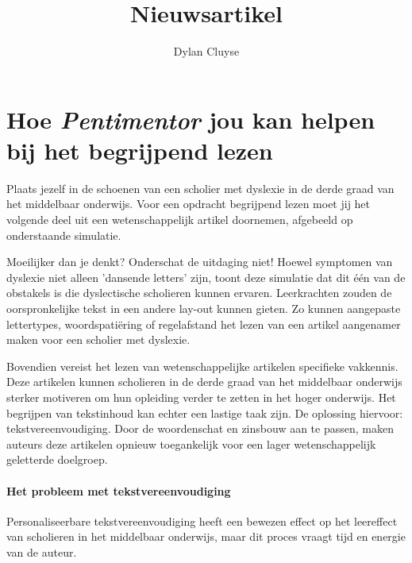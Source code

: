 \documentclass[a4paper,9pt,twoside]{report}
\title{Nieuwsartikel}
\author{Dylan {Cluyse}}
\begin{document}
	
\chapter{Hoe \textit{Pentimentor} jou kan helpen bij het begrijpend lezen}

\noindent Plaats jezelf in de schoenen van een scholier met dyslexie in de derde graad van het middelbaar onderwijs. Voor een opdracht begrijpend lezen moet jij het volgende deel uit een wetenschappelijk artikel doornemen, afgebeeld op onderstaande simulatie.

\begin{figure}[H]
\end{figure}

\noindent Moeilijker dan je denkt? Onderschat de uitdaging niet! Hoewel symptomen van dyslexie niet alleen 'dansende letters'  zijn, toont deze simulatie dat dit één van de obstakels is die dyslectische scholieren kunnen ervaren. Leerkrachten zouden de oorspronkelijke tekst in een andere lay-out kunnen gieten. Zo kunnen aangepaste lettertypes, woordspatiëring of regelafstand het lezen van een artikel aangenamer maken voor een scholier met dyslexie.

\medspace

\noindent Bovendien vereist het lezen van wetenschappelijke artikelen specifieke vakkennis. Deze artikelen kunnen scholieren in de derde graad van het middelbaar onderwijs sterker motiveren om hun opleiding verder te zetten in het hoger onderwijs. Het begrijpen van tekstinhoud kan echter een lastige taak zijn. De oplossing hiervoor: tekstvereenvoudiging. Door de woordenschat en zinsbouw aan te passen, maken auteurs deze artikelen opnieuw toegankelijk voor een lager wetenschappelijk geletterde doelgroep. 

\subsubsection{Het probleem met tekstvereenvoudiging}

\noindent Personaliseerbare tekstvereenvoudiging heeft een bewezen effect op het leereffect van scholieren in het middelbaar onderwijs, maar dit proces vraagt tijd en energie van de auteur.
\end{document}
